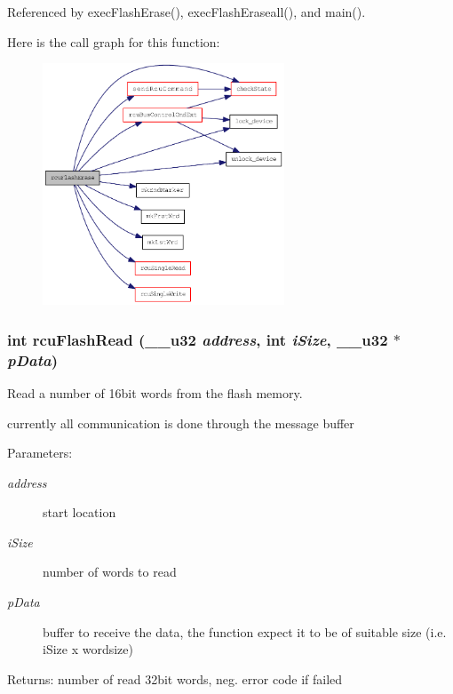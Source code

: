 Referenced by exec\-Flash\-Erase(), exec\-Flash\-Eraseall(), and main().

Here is the call graph for this function:\begin{figure}[H]
\begin{center}
\leavevmode
\includegraphics[width=204pt]{group__dcsc__msg__buffer__access_g78e6fc883a098cf548e9d0ba618ecb16_cgraph}
\end{center}
\end{figure}
\hypertarget{group__dcsc__msg__buffer__access_g24164f14711ead31a7e542711f0a08b3}{
\subsubsection[rcuFlashRead]{\setlength{\rightskip}{0pt plus 5cm}int rcu\-Flash\-Read (\_\-\_\-u32 {\em address}, int {\em i\-Size}, \_\-\_\-u32 $\ast$ {\em p\-Data})}}
\label{group__dcsc__msg__buffer__access_g24164f14711ead31a7e542711f0a08b3}


Read a number of 16bit words from the flash memory. 

currently all communication is done through the message buffer \begin{Desc}
\item[Parameters:]
\begin{description}
\item[{\em address}]start location \item[{\em i\-Size}]number of words to read \item[{\em p\-Data}]buffer to receive the data, the function expect it to be of suitable size (i.e. i\-Size x wordsize) \end{description}
\end{Desc}
\begin{Desc}
\item[Returns:]number of read 32bit words, neg. error code if failed \end{Desc}


